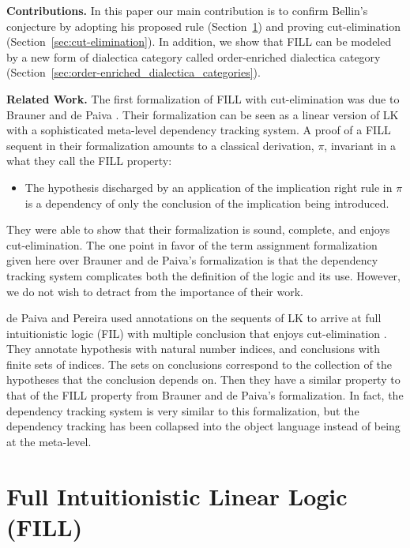 \textbf{Contributions.} In this paper our main contribution is to
confirm Bellin's conjecture by adopting his proposed rule
(Section~\ref{sec:full_intuitionistic_linear_logic_(fill)}) and
proving cut-elimination (Section~\ref{sec:cut-elimination}).  In
addition, we show that FILL can be modeled by a new form of dialectica
category called order-enriched dialectica category
(Section~\ref{sec:order-enriched_dialectica_categories}).

\textbf{Related Work.} The first formalization of FILL with
cut-elimination was due to Brauner and de Paiva \cite{Brauner:1998}.
Their formalization can be seen as a linear version of LK with a
sophisticated meta-level dependency tracking system.  A proof of a
FILL sequent in their formalization amounts to a classical derivation,
$\pi$, invariant in a what they call the FILL property:
\begin{center}
  \begin{itemize}
  \item The hypothesis discharged by an application of the implication
    right rule in $\pi$ is a dependency of only the conclusion of the
    implication being introduced.
  \end{itemize}
\end{center}
They were able to show that their formalization is sound, complete,
and enjoys cut-elimination.  The one point in favor of the term
assignment formalization given here over Brauner and de Paiva's
formalization is that the dependency tracking system complicates both
the definition of the logic and its use.  However, we do not wish to
detract from the importance of their work.

de Paiva and Pereira used annotations on the sequents of LK to arrive
at full intuitionistic logic (FIL) with multiple conclusion that
enjoys cut-elimination \cite{dePaiva:2005}. They annotate hypothesis
with natural number indices, and conclusions with finite sets of
indices.  The sets on conclusions correspond to the collection of the
hypotheses that the conclusion depends on.  Then they have a similar
property to that of the FILL property from Brauner and de Paiva's
formalization.  In fact, the dependency tracking system is very
similar to this formalization, but the dependency tracking has been
collapsed into the object language instead of being at the meta-level.

\section{Full Intuitionistic Linear Logic (FILL)}
\label{sec:full_intuitionistic_linear_logic_(fill)}

